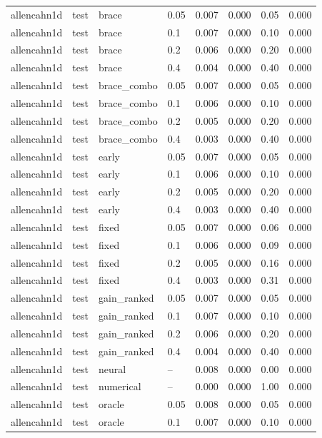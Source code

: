 \begin{tabular}{llllrrrr}
allencahn1d & test & brace & 0.05 & 0.007 & 0.000 & 0.05 & 0.000 \\
allencahn1d & test & brace & 0.1 & 0.007 & 0.000 & 0.10 & 0.000 \\
allencahn1d & test & brace & 0.2 & 0.006 & 0.000 & 0.20 & 0.000 \\
allencahn1d & test & brace & 0.4 & 0.004 & 0.000 & 0.40 & 0.000 \\
allencahn1d & test & brace\_combo & 0.05 & 0.007 & 0.000 & 0.05 & 0.000 \\
allencahn1d & test & brace\_combo & 0.1 & 0.006 & 0.000 & 0.10 & 0.000 \\
allencahn1d & test & brace\_combo & 0.2 & 0.005 & 0.000 & 0.20 & 0.000 \\
allencahn1d & test & brace\_combo & 0.4 & 0.003 & 0.000 & 0.40 & 0.000 \\
allencahn1d & test & early & 0.05 & 0.007 & 0.000 & 0.05 & 0.000 \\
allencahn1d & test & early & 0.1 & 0.006 & 0.000 & 0.10 & 0.000 \\
allencahn1d & test & early & 0.2 & 0.005 & 0.000 & 0.20 & 0.000 \\
allencahn1d & test & early & 0.4 & 0.003 & 0.000 & 0.40 & 0.000 \\
allencahn1d & test & fixed & 0.05 & 0.007 & 0.000 & 0.06 & 0.000 \\
allencahn1d & test & fixed & 0.1 & 0.006 & 0.000 & 0.09 & 0.000 \\
allencahn1d & test & fixed & 0.2 & 0.005 & 0.000 & 0.16 & 0.000 \\
allencahn1d & test & fixed & 0.4 & 0.003 & 0.000 & 0.31 & 0.000 \\
allencahn1d & test & gain\_ranked & 0.05 & 0.007 & 0.000 & 0.05 & 0.000 \\
allencahn1d & test & gain\_ranked & 0.1 & 0.007 & 0.000 & 0.10 & 0.000 \\
allencahn1d & test & gain\_ranked & 0.2 & 0.006 & 0.000 & 0.20 & 0.000 \\
allencahn1d & test & gain\_ranked & 0.4 & 0.004 & 0.000 & 0.40 & 0.000 \\
allencahn1d & test & neural & -- & 0.008 & 0.000 & 0.00 & 0.000 \\
allencahn1d & test & numerical & -- & 0.000 & 0.000 & 1.00 & 0.000 \\
allencahn1d & test & oracle & 0.05 & 0.008 & 0.000 & 0.05 & 0.000 \\
allencahn1d & test & oracle & 0.1 & 0.007 & 0.000 & 0.10 & 0.000 \\

\end{tabular}
